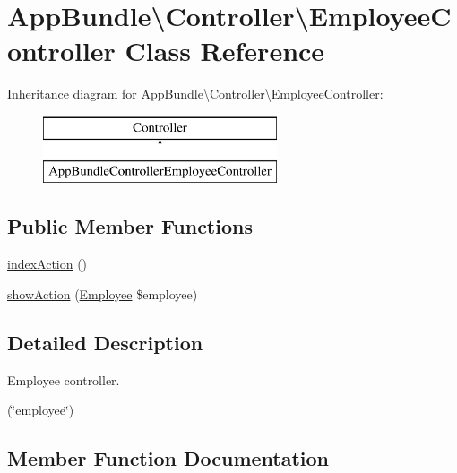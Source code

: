 \hypertarget{class_app_bundle_1_1_controller_1_1_employee_controller}{}\section{App\+Bundle\textbackslash{}Controller\textbackslash{}Employee\+Controller Class Reference}
\label{class_app_bundle_1_1_controller_1_1_employee_controller}
Inheritance diagram for App\+Bundle\textbackslash{}Controller\textbackslash{}Employee\+Controller\+:\begin{figure}[H]
\begin{center}
\leavevmode
\includegraphics[height=2.000000cm]{class_app_bundle_1_1_controller_1_1_employee_controller}
\end{center}
\end{figure}
\subsection*{Public Member Functions}
\begin{DoxyCompactItemize}
\item 
\mbox{\hyperlink{class_app_bundle_1_1_controller_1_1_employee_controller_af8d48d3c6654baacd1505b289e64070a}{index\+Action}} ()
\item 
\mbox{\hyperlink{class_app_bundle_1_1_controller_1_1_employee_controller_a7392ff83d0857c8e8ee5e3a8707ce4cf}{show\+Action}} (\mbox{\hyperlink{class_app_bundle_1_1_entity_1_1_employee}{Employee}} \$employee)
\end{DoxyCompactItemize}


\subsection{Detailed Description}
Employee controller.

(\char`\"{}employee\char`\"{}) 

\subsection{Member Function Documentation}
\mbox{\label{class_app_bundle_1_1_controller_1_1_employee_controller_af8d48d3c6654baacd1505b289e64070a}} 

